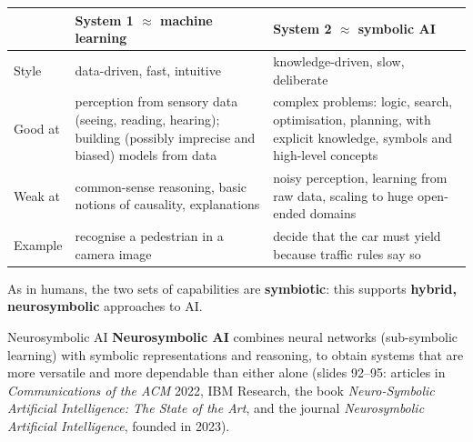 \begin{center}
\small
\begin{tabularx}{\linewidth}{@{}l >{\raggedright\arraybackslash}X >{\raggedright\arraybackslash}X@{}}
\toprule
 & \textbf{System 1 $\approx$ machine learning} & \textbf{System 2 $\approx$ symbolic AI} \\
\midrule
Style & data-driven, fast, intuitive & knowledge-driven, slow, deliberate \\
Good at & perception from sensory data (seeing, reading, hearing); building (possibly
  imprecise and biased) models from data & complex problems: logic, search, optimisation,
  planning, with explicit knowledge, symbols and high-level concepts \\
Weak at & common-sense reasoning, basic notions of causality, explanations & noisy
  perception, learning from raw data, scaling to huge open-ended domains \\
Example & recognise a pedestrian in a camera image & decide that the car must yield
  because traffic rules say so \\
\bottomrule
\end{tabularx}
\end{center}

As in humans, the two sets of capabilities are \textbf{symbiotic}: this supports
\textbf{hybrid, neurosymbolic} approaches to AI.

\begin{nbdef}{Neurosymbolic AI}
\textbf{Neurosymbolic AI} combines neural networks (sub-symbolic learning) with symbolic
representations and reasoning, to obtain systems that are more versatile and more
dependable than either alone (slides 92--95: articles in \emph{Communications of the ACM}
2022, IBM Research, the book \emph{Neuro-Symbolic Artificial Intelligence: The State of the
Art}, and the journal \emph{Neurosymbolic Artificial Intelligence}, founded in 2023).
\end{nbdef}

